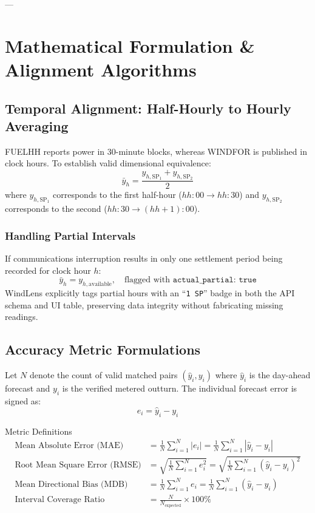 \documentclass[11pt,a4paper]{article}
\begin{document}
---

\section{Mathematical Formulation \& Alignment Algorithms}

\subsection{Temporal Alignment: Half-Hourly to Hourly Averaging}
FUELHH reports power in 30-minute blocks, whereas WINDFOR is published in clock hours. To establish valid dimensional equivalence:
\begin{equation}
\bar{y}_h = \frac{y_{h, \text{SP}_1} + y_{h, \text{SP}_2}}{2}
\end{equation}
where $y_{h, \text{SP}_1}$ corresponds to the first half-hour ($hh:00 \to hh:30$) and $y_{h, \text{SP}_2}$ corresponds to the second ($hh:30 \to (hh+1):00$).

\subsubsection{Handling Partial Intervals}
If communications interruption results in only one settlement period being recorded for clock hour $h$:
\begin{equation}
\bar{y}_h = y_{h, \text{available}}, \quad \text{flagged with } \texttt{actual\_partial: true}
\end{equation}
WindLens explicitly tags partial hours with an ``\texttt{1 SP}'' badge in both the API schema and UI table, preserving data integrity without fabricating missing readings.

\subsection{Accuracy Metric Formulations}
Let $N$ denote the count of valid matched pairs $(\hat{y}_i, y_i)$ where $\hat{y}_i$ is the day-ahead forecast and $y_i$ is the verified metered outturn.
The individual forecast error is signed as:
\begin{equation}
e_i = \hat{y}_i - y_i
\end{equation}

\begin{mathbox}{Metric Definitions}
\begin{align}
\text{Mean Absolute Error (MAE)} &= \frac{1}{N} \sum_{i=1}^N |e_i| = \frac{1}{N} \sum_{i=1}^N |\hat{y}_i - y_i| \\
\text{Root Mean Square Error (RMSE)} &= \sqrt{\frac{1}{N} \sum_{i=1}^N e_i^2} = \sqrt{\frac{1}{N} \sum_{i=1}^N (\hat{y}_i - y_i)^2} \\
\text{Mean Directional Bias (MDB)} &= \frac{1}{N} \sum_{i=1}^N e_i = \frac{1}{N} \sum_{i=1}^N (\hat{y}_i - y_i) \\
\text{Interval Coverage Ratio} &= \frac{N}{N_{\text{expected}}} \times 100\%
\end{align}
\end{mathbox}
\end{document}
